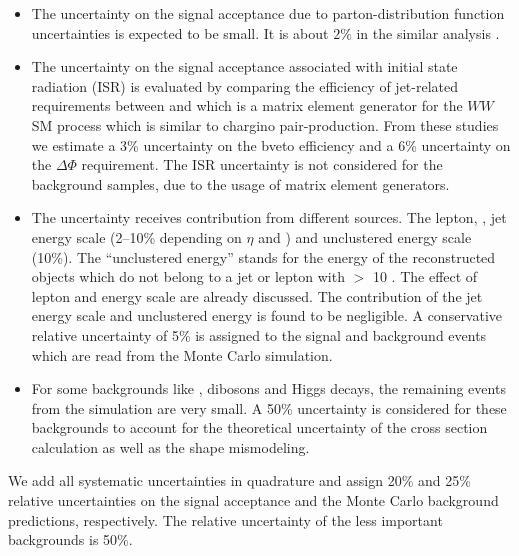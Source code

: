 \begin{itemize}
\item The uncertainty on the signal acceptance due to parton-distribution
  function uncertainties is expected to be small.
  It is about $2\%$ in the similar analysis \cite{Khachatryan:2014qwa}.

\item The uncertainty on the signal acceptance associated with initial state
  radiation (ISR) is evaluated by comparing the efficiency of jet-related
  requirements between \PYTHIA and \MADGRAPH which is a matrix element generator 
  for the $WW$ SM process which
  is similar to chargino pair-production.  From these studies we estimate
  a 3\% uncertainty on the bveto efficiency and a 6\% uncertainty on the
  $\Delta \Phi$ requirement.
  The ISR uncertainty is not considered for the background samples, due to the
  usage of  matrix element  generators.


\item The \MET uncertainty receives contribution from different sources. The lepton, \Tau, jet energy scale 
(2–10\% depending on $\eta$ and \PT) and unclustered energy scale (10\%). The ``unclustered energy'' stands for the energy of the 
reconstructed objects which do not belong to a jet or lepton with \PT $>$ 10 \GEV.
The effect of lepton and \Tau energy scale are already discussed. The contribution of the jet energy scale and unclustered energy is 
found to be negligible. A conservative relative uncertainty of 5\% is assigned to the signal and background events which are read from the 
Monte Carlo simulation.
\item For some backgrounds like \ttbar,  dibosons and Higgs decays, the remaining 
events from the simulation are very small. A 50\% uncertainty is considered for these backgrounds to account for the theoretical uncertainty of the
cross section calculation as well as the shape mismodeling.
\end{itemize}


\noindent We add all systematic uncertainties in quadrature and assign 
 20\% and 25\% relative uncertainties on the signal
acceptance and the Monte Carlo background predictions, respectively. The relative uncertainty of the 
less important backgrounds is 50\%.

